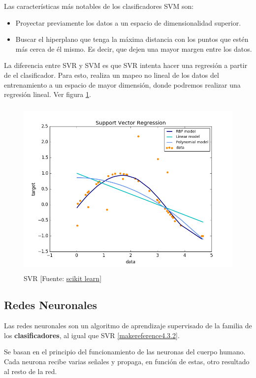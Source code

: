 	Las características más notables de los clasificadores SVM son:
	\begin{itemize}
		\item Proyectar previamente los datos a un espacio de dimensionalidad superior.
		\item Buscar el hiperplano que tenga la máxima distancia con los puntos que estén más cerca de él mismo. Es decir, que dejen una mayor margen entre los datos.
	\end{itemize}

	La diferencia entre SVR y SVM es que SVR intenta hacer una regresión a partir de el clasificador. Para esto, realiza un mapeo no lineal de los datos del entrenamiento a un espacio de mayor dimensión, donde podremos realizar una regresión lineal. Ver figura \ref{svr}.

	\begin{figure}[htb]
		\begin{center}
			\includegraphics[height=3.5in]{figures/svr.png}
			\caption{SVR [Fuente: \href{http://scikit-learn.org/stable/auto_examples/svm/plot_svm_regression.html}{scikit learn}] }
		\end{center}
		\label{svr}
	\end{figure}
	
	\subsection{Redes Neuronales}
	\label{makereference4.3.3}
	Las redes neuronales son un algoritmo de aprendizaje supervisado de la familia de los \textbf{clasificadores}, al igual que SVR \ref{makereference4.3.2}.

	Se basan en el principio del funcionamiento de las neuronas del cuerpo humano. Cada neurona recibe varias señales y propaga, en función de estas, otro resultado al resto de la red.

